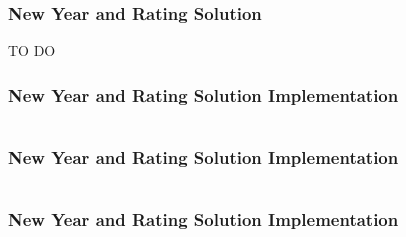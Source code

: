 \documentclass{beamer}
\newcommand{\codeforceslink}[2]{CodeForces (http://www.codeforces.com)
  problem: \href{#2}{\textcolor{blue}{#1}.}}
\newcounter{exo}
\newcommand{\exo}{
  \addtocounter{exo}{1}
  Exercice \arabic{exo}
}
\begin{document}
\fi


\ifanswers

\begin{frame}%
\frametitle{New Year and Rating Solution}

TO DO

\end{frame}

\begin{frame}[containsverbatim]
\frametitle{New Year and Rating Solution Implementation}
\scriptsize

\begin{lstlisting}[mathescape]
\end{lstlisting}

\end{frame}

\begin{frame}[containsverbatim]
\frametitle{New Year and Rating Solution Implementation}
\scriptsize

\begin{lstlisting}[mathescape]
\end{lstlisting}

\end{frame}

\begin{frame}[containsverbatim]
\frametitle{New Year and Rating Solution Implementation}
\scriptsize

\begin{lstlisting}[mathescape]
\end{lstlisting}

\end{frame}

\fi

\end{document}
